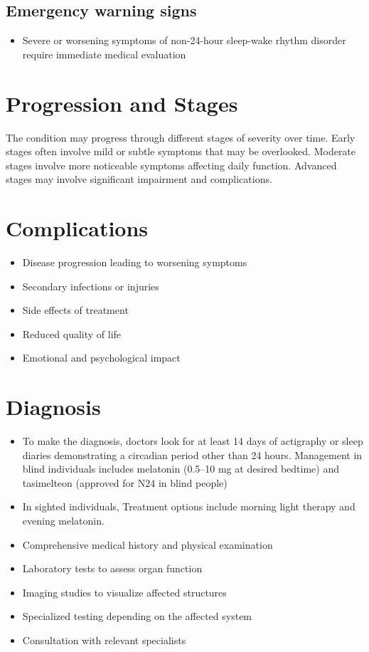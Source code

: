 \subsection{Emergency warning signs}
\begin{itemize}[noitemsep]
  \item Severe or worsening symptoms of non-24-hour sleep-wake rhythm disorder require immediate medical evaluation
\end{itemize}
\section{Progression and Stages}
The condition may progress through different stages of severity over time. Early stages often involve mild or subtle symptoms that may be overlooked. Moderate stages involve more noticeable symptoms affecting daily function. Advanced stages may involve significant impairment and complications.
\section{Complications}
\begin{itemize}[noitemsep]
  \item Disease progression leading to worsening symptoms
  \item Secondary infections or injuries
  \item Side effects of treatment
  \item Reduced quality of life
  \item Emotional and psychological impact
\end{itemize}
\section{Diagnosis}
\begin{itemize}[noitemsep]
  \item To make the diagnosis, doctors look for at least 14 days of actigraphy or sleep diaries demonstrating a circadian period other than 24 hours. Management in blind individuals includes melatonin (0.5--10 mg at desired bedtime) and tasimelteon (approved for N24 in blind people)
  \item In sighted individuals, Treatment options include morning light therapy and evening melatonin.
  \item Comprehensive medical history and physical examination
  \item Laboratory tests to assess organ function
  \item Imaging studies to visualize affected structures
  \item Specialized testing depending on the affected system
  \item Consultation with relevant specialists
\end{itemize}
